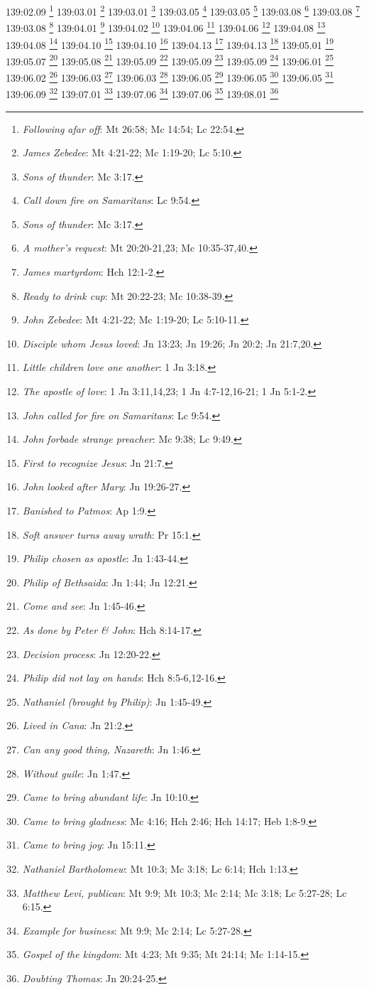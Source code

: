 {{{{{{139:02.09 \footnote{\textit{Following afar off}: Mt 26:58; Mc 14:54; Lc 22:54.}
139:03.01 \footnote{\textit{James Zebedee}: Mt 4:21-22; Mc 1:19-20; Lc 5:10.}
139:03.01 \footnote{\textit{Sons of thunder}: Mc 3:17.}
139:03.05 \footnote{\textit{Call down fire on Samaritans}: Lc 9:54.}
139:03.05 \footnote{\textit{Sons of thunder}: Mc 3:17.}
139:03.08 \footnote{\textit{A mother's request}: Mt 20:20-21,23; Mc 10:35-37,40.}
139:03.08 \footnote{\textit{James martyrdom}: Hch 12:1-2.}
139:03.08 \footnote{\textit{Ready to drink cup}: Mt 20:22-23; Mc 10:38-39.}
139:04.01 \footnote{\textit{John Zebedee}: Mt 4:21-22; Mc 1:19-20; Lc 5:10-11.}
139:04.02 \footnote{\textit{Disciple whom Jesus loved}: Jn 13:23; Jn 19:26; Jn 20:2; Jn 21:7,20.}
139:04.06 \footnote{\textit{Little children love one another}: 1 Jn 3:18.}
139:04.06 \footnote{\textit{The apostle of love}: 1 Jn 3:11,14,23; 1 Jn 4:7-12,16-21; 1 Jn 5:1-2.}
139:04.08 \footnote{\textit{John called for fire on Samaritans}: Lc 9:54.}
139:04.08 \footnote{\textit{John forbade strange preacher}: Mc 9:38; Lc 9:49.}
139:04.10 \footnote{\textit{First to recognize Jesus}: Jn 21:7.}
139:04.10 \footnote{\textit{John looked after Mary}: Jn 19:26-27.}
139:04.13 \footnote{\textit{Banished to Patmos}: Ap 1:9.}
139:04.13 \footnote{\textit{Soft answer turns away wrath}: Pr 15:1.}
139:05.01 \footnote{\textit{Philip chosen as apostle}: Jn 1:43-44.}
139:05.07 \footnote{\textit{Philip of Bethsaida}: Jn 1:44; Jn 12:21.}
139:05.08 \footnote{\textit{Come and see}: Jn 1:45-46.}
139:05.09 \footnote{\textit{As done by Peter & John}: Hch 8:14-17.}
139:05.09 \footnote{\textit{Decision process}: Jn 12:20-22.}
139:05.09 \footnote{\textit{Philip did not lay on hands}: Hch 8:5-6,12-16.}
139:06.01 \footnote{\textit{Nathaniel (brought by Philip)}: Jn 1:45-49.}
139:06.02 \footnote{\textit{Lived in Cana}: Jn 21:2.}
139:06.03 \footnote{\textit{Can any good thing, Nazareth}: Jn 1:46.}
139:06.03 \footnote{\textit{Without guile}: Jn 1:47.}
139:06.05 \footnote{\textit{Came to bring abundant life}: Jn 10:10.}
139:06.05 \footnote{\textit{Came to bring gladness}: Mc 4:16; Hch 2:46; Hch 14:17; Heb 1:8-9.}
139:06.05 \footnote{\textit{Came to bring joy}: Jn 15:11.}
139:06.09 \footnote{\textit{Nathaniel Bartholomew}: Mt 10:3; Mc 3:18; Lc 6:14; Hch 1:13.}
139:07.01 \footnote{\textit{Matthew Levi, publican}: Mt 9:9; Mt 10:3; Mc 2:14; Mc 3:18; Lc 5:27-28; Lc 6:15.}
139:07.06 \footnote{\textit{Example for business}: Mt 9:9; Mc 2:14; Lc 5:27-28.}
139:07.06 \footnote{\textit{Gospel of the kingdom}: Mt 4:23; Mt 9:35; Mt 24:14; Mc 1:14-15.}
139:08.01 \footnote{\textit{Doubting Thomas}: Jn 20:24-25.}
}}}}}}

